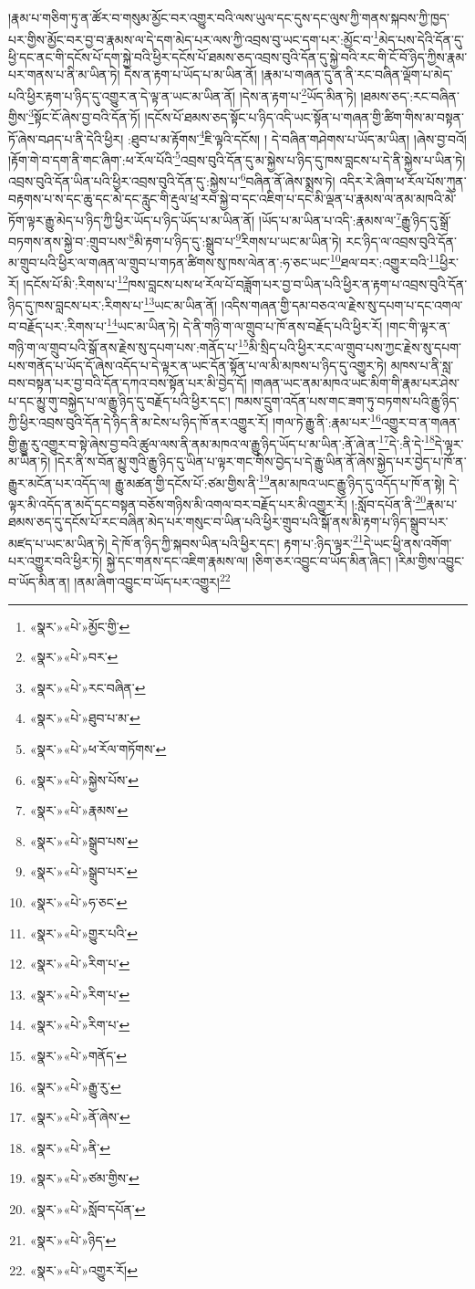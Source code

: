 །རྣམ་པ་གཅིག་ཏུ་ན་ཚོར་བ་གསུམ་མྱོང་བར་འགྱུར་བའི་ལས་ཡུལ་དང་དུས་དང་ལུས་ཀྱི་གནས་སྐབས་ཀྱི་ཁྱད་པར་གྱིས་མྱོང་བར་བྱ་བ་རྣམས་ལ་དེ་དག་མེད་པར་ལས་ཀྱི་འབྲས་བུ་ཡང་དག་པར་:མྱོང་བ་\footnote{«སྣར་»«པེ་»མྱོང་གྱི་}མེད་པས་དེའི་དོན་དུ་ཕྱི་དང་ནང་གི་དངོས་པོ་དག་སྐྱེ་བའི་ཕྱིར་དངོས་པོ་ཐམས་ཅད་འབྲས་བུའི་དོན་དུ་སྐྱེ་བའི་རང་གི་ངོ་བོ་ཉིད་ཀྱིས་རྣམ་པར་གནས་པ་ནི་མ་ཡིན་ཏེ། དེས་ན་རྟག་པ་ཡོད་པ་མ་ཡིན་ནོ། །རྣམ་པ་གཞན་དུ་ན་ནི་རང་བཞིན་ལྡོག་པ་མེད་པའི་ཕྱིར་རྟག་པ་ཉིད་དུ་འགྱུར་ན་དེ་ལྟ་ན་ཡང་མ་ཡིན་ནོ། །དེས་ན་རྟག་པ་\footnote{«སྣར་»«པེ་»བར་}ཡོད་མིན་ཏེ། །ཐམས་ཅད་:རང་བཞིན་གྱིས་\footnote{«སྣར་»«པེ་»རང་བཞིན་}སྟོང་ངོ་ཞེས་བྱ་བའི་དོན་ཏོ། །དངོས་པོ་ཐམས་ཅད་སྟོང་པ་ཉིད་འདི་ཡང་སྟོན་པ་གཞན་གྱི་ཚིག་གིས་མ་བསྟན་ཏོ་ཞེས་བཤད་པ་ནི་དེའི་ཕྱིར། :ཐུབ་པ་མ་རྟོགས་\footnote{«སྣར་»«པེ་»ཐུབ་པ་མ་}ཇི་ལྟའི་དངོས། །
དེ་བཞིན་གཤེགས་པ་ཡོད་མ་ཡིན། །ཞེས་བྱ་བའོ། །རྟོག་གེ་བ་དག་ནི་གང་ཞིག་:ཕ་རོལ་པོའི་\footnote{«སྣར་»«པེ་»ཕ་རོལ་གཏོགས་}འབྲས་བུའི་དོན་དུ་མ་སྐྱེས་པ་ཉིད་དུ་ཁས་བླངས་པ་དེ་ནི་སྐྱེས་པ་ཡིན་ཏེ། འབྲས་བུའི་དོན་ཡིན་པའི་ཕྱིར་འབྲས་བུའི་དོན་དུ་:སྐྱེས་པ་\footnote{«སྣར་»«པེ་»སྐྱེས་པོས་}བཞིན་ནོ་ཞེས་སྨྲས་ཏེ། འདིར་རེ་ཞིག་ཕ་རོལ་པོས་ཀུན་བརྟགས་པ་ས་དང་ཆུ་དང་མེ་དང་རླུང་གི་རྡུལ་ཕྲ་རབ་སྐྱེ་བ་དང་འཇིག་པ་དང་མི་ལྡན་པ་རྣམས་ལ་ནམ་མཁའི་མེ་ཏོག་ལྟར་རྒྱུ་མེད་པ་ཉིད་ཀྱི་ཕྱིར་ཡོད་པ་ཉིད་ཡོད་པ་མ་ཡིན་ནོ། །ཡོད་པ་མ་ཡིན་པ་འདི་:རྣམས་ལ་\footnote{«སྣར་»«པེ་»རྣམས་}རྒྱུ་ཉིད་དུ་སྒྲོ་བཏགས་ནས་སྐྱེ་བ་:གྲུབ་པས་\footnote{«སྣར་»«པེ་»སྒྲུབ་པས་}མི་རྟག་པ་ཉིད་དུ་:སྒྲུབ་པ་\footnote{«སྣར་»«པེ་»སྒྲུབ་པར་}རིགས་པ་ཡང་མ་ཡིན་ཏེ། རང་ཉིད་ལ་འབྲས་བུའི་དོན་མ་གྲུབ་པའི་ཕྱིར་ལ་གཞན་ལ་གྲུབ་པ་གཏན་ཚིགས་སུ་ཁས་ལེན་ན་:ཧ་ཅང་ཡང་\footnote{«སྣར་»«པེ་»ཧ་ཅང་}ཐལ་བར་:འགྱུར་བའི་\footnote{«སྣར་»«པེ་»གྱུར་པའི་}ཕྱིར་རོ། །དངོས་པོ་མི་:རིགས་པ་\footnote{«སྣར་»«པེ་»རིག་པ་}ཁས་བླངས་པས་ཕ་རོལ་པོ་བཟློག་པར་བྱ་བ་ཡིན་པའི་ཕྱིར་ན་རྟག་པ་འབྲས་བུའི་དོན་ཉིད་དུ་ཁས་བླངས་པར་:རིགས་པ་\footnote{«སྣར་»«པེ་»རིག་པ་}ཡང་མ་ཡིན་ནོ། །འདིས་གཞན་གྱི་དམ་བཅའ་ལ་རྗེས་སུ་དཔག་པ་དང་འགལ་བ་བརྗོད་པར་:རིགས་པ་\footnote{«སྣར་»«པེ་»རིག་པ་}ཡང་མ་ཡིན་ཏེ། དེ་ནི་གཉི་ག་ལ་གྲུབ་པ་ཁོ་ནས་བརྗོད་པའི་ཕྱིར་རོ། །གང་གི་ལྟར་ན་གཉི་ག་ལ་གྲུབ་པའི་སྒོ་ནས་རྗེས་སུ་དཔག་པས་:གནོད་པ་\footnote{«སྣར་»«པེ་»གནོད་}མི་སྲིད་པའི་ཕྱིར་རང་ལ་གྲུབ་པས་ཀྱང་རྗེས་སུ་དཔག་པས་གནོད་པ་ཡོད་དོ་ཞེས་འདོད་པ་དེ་ལྟར་ན་ཡང་དོན་སྟོན་པ་ལ་མི་མཁས་པ་ཉིད་དུ་འགྱུར་ཏེ། མཁས་པ་ནི་སླ་བས་བསྟན་པར་བྱ་བའི་དོན་དཀའ་བས་སྟོན་པར་མི་བྱེད་དོ། །གཞན་ཡང་ནམ་མཁའ་ཡང་མིག་གི་རྣམ་པར་ཤེས་པ་དང་མྱུ་གུ་བསྐྱེད་པ་ལ་རྒྱུ་ཉིད་དུ་བརྗོད་པའི་ཕྱིར་དང་། ཁམས་དྲུག་འདོན་པས་གང་ཟག་ཏུ་བཏགས་པའི་རྒྱུ་ཉིད་ཀྱི་ཕྱིར་འབྲས་བུའི་དོན་དེ་ཉིད་ནི་མ་ངེས་པ་ཉིད་ཁོ་ནར་འགྱུར་རོ། །གལ་ཏེ་རྒྱུ་ནི་:རྣམ་པར་\footnote{«སྣར་»«པེ་»རྒྱུ་རུ་}འགྱུར་བ་ན་གཞན་གྱི་རྒྱུ་རུ་འགྱུར་བ་སྟེ་ཞེས་བྱ་བའི་ཚུལ་ལས་ནི་ནམ་མཁའ་ལ་རྒྱུ་ཉིད་ཡོད་པ་མ་ཡིན་:ནོ་ཞེ་ན་\footnote{«སྣར་»«པེ་»ནོ་ཞེས་}དེ་:ནི་དེ་\footnote{«སྣར་»«པེ་»ནི་}དེ་ལྟར་མ་ཡིན་ཏེ། །དེར་ནི་ས་བོན་མྱུ་གུའི་རྒྱུ་ཉིད་དུ་ཡིན་པ་ལྟར་གང་གིས་བྱེད་པ་དེ་རྒྱུ་ཡིན་ནོ་ཞེས་སྐྱེད་པར་བྱེད་པ་ཁོ་ན་རྒྱུར་མངོན་པར་འདོད་ལ། རྒྱུ་མཚན་གྱི་དངོས་པོ་:ཙམ་གྱིས་ནི་\footnote{«སྣར་»«པེ་»ཙམ་གྱིས་}ནམ་མཁའ་ཡང་རྒྱུ་ཉིད་དུ་འདོད་པ་ཁོ་ན་སྟེ། དེ་ལྟར་མི་འདོད་ན་མདོ་དང་བསྟན་བཅོས་གཉིས་མི་འགལ་བར་བརྗོད་པར་མི་འགྱུར་རོ། །:སློབ་དཔོན་ནི་\footnote{«སྣར་»«པེ་»སློབ་དཔོན་}རྣམ་པ་ཐམས་ཅད་དུ་དངོས་པོ་རང་བཞིན་མེད་པར་གསུང་བ་ཡིན་པའི་ཕྱིར་གྲུབ་པའི་སྒོ་ནས་མི་རྟག་པ་ཉིད་སྒྲུབ་པར་མཛད་པ་ཡང་མ་ཡིན་ཏེ། དེ་ཁོ་ན་ཉིད་ཀྱི་སྐབས་ཡིན་པའི་ཕྱིར་དང་། རྟག་པ་:ཉིད་ལྟར་\footnote{«སྣར་»«པེ་»ཉིད་}དེ་ཡང་ཕྱི་ནས་འགོག་པར་འགྱུར་བའི་ཕྱིར་ཏེ། སྐྱེ་དང་གནས་དང་འཇིག་རྣམས་ལ། །ཅིག་ཅར་འབྱུང་བ་ཡོད་མིན་ཞིང་། །རིམ་གྱིས་འབྱུང་བ་ཡོད་མིན་ན། །ནམ་ཞིག་འབྱུང་བ་ཡོད་པར་འགྱུར།\footnote{«སྣར་»«པེ་»འགྱུར་རོ།} 